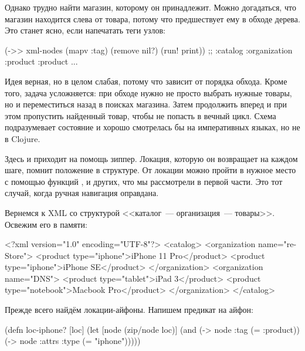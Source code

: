 Однако трудно найти магазин, которому он принадлежит. Можно догадаться, что
магазин находится слева от товара, потому что предшествует ему в обходе
дерева. Это станет ясно, если напечатать теги узлов:

\begin{english}
  \begin{clojure}
(->> xml-nodes (mapv :tag) (remove nil?) (run! print))
;; :catalog :organization :product :product ...
  \end{clojure}
\end{english}

Идея верная, но в целом слабая, потому что зависит от порядка обхода. Кроме
того, задача усложняется: при обходе нужно не просто выбрать нужные товары, но и
переместиться назад в поисках магазина. Затем продолжить вперед и при этом
пропустить найденный товар, чтобы не попасть в вечный цикл. Схема подразумевает
состояние и хорошо смотрелась бы на императивных языках, но не в Clojure.

Здесь и приходит на помощь зиппер. Локация, которую он возвращает на каждом
шаге, помнит положение в структуре. От локации можно пройти в нужное место с
помощью функций ,  и других, что мы рассмотрели в первой
части. Это тот случай, когда ручная навигация оправдана.

Вернемся к XML со структурой <<каталог~--- организация~--- товары>>. Освежим его в
памяти:

\begin{english}
  \begin{xml}
<?xml version="1.0" encoding="UTF-8"?>
<catalog>
  <organization name="re-Store">
    <product type="iphone">iPhone 11 Pro</product>
    <product type="iphone">iPhone SE</product>
  </organization>
  <organization name="DNS">
    <product type="tablet">iPad 3</product>
    <product type="notebook">Macbook Pro</product>
  </organization>
</catalog>
  \end{xml}
\end{english}

Прежде всего найдём локации-айфоны. Напишем предикат на айфон:

\begin{english}
  \begin{clojure}
(defn loc-iphone? [loc]
  (let [node (zip/node loc)]
    (and (-> node :tag (= :product))
         (-> node :attrs :type (= "iphone")))))
  \end{clojure}
\end{english}

